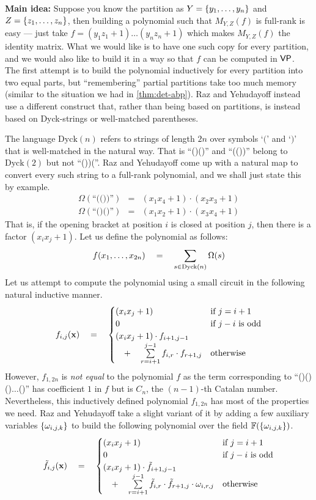 {\bf Main idea:} Suppose you know the partition as $Y = \left\{y_1,\dots, y_n\right\}$ and $Z = \left\{z_1,\dots, z_n\right\}$, then building a polynomial such that $M_{Y,Z}(f)$ is full-rank is easy --- just take $f = (y_1z_1 + 1)\dots (y_n z_n + 1)$ which makes $M_{Y,Z}(f)$ the identity matrix. 
What we would like is to have one such copy for every partition, and we would also like to build it in a way so that $f$ can be computed in $\mathsf{VP}$. \\

The first attempt is to build the polynomial inductively for every partition into two equal parts, but ``remembering'' partial partitions take too much memory (similar to the situation we had in \autoref{thm:det-abp}). 
Raz and Yehudayoff instead use a different construct that, rather than being based on partitions, is instead based on Dyck-strings or well-matched parentheses. 

The language $\mathrm{Dyck}(n)$ refers to strings of length $2n$ over symbols `$($' and `$)$' that is well-matched in the natural way. 
That is ``()()'' and ``(())'' belong to $\mathrm{Dyck}(2)$ but not ``())(''. 
Raz and Yehudayoff come up with a natural map to convert every such string to a full-rank polynomial, and we shall just state this by example. 
\begin{eqnarray*}
\Omega(\text{``(())''}) & = & (x_1x_4 + 1)\cdot (x_2x_3 + 1)\\
\Omega(\text{``()()''}) & = & (x_1x_2 + 1)\cdot (x_3x_4 + 1)
\end{eqnarray*}
That is, if the opening bracket at position $i$ is closed at position $j$, then there is a factor $(x_ix_j + 1)$. 
Let us define the polynomial as follows:
\[
f(x_1,\dots, x_{2n}) \quad = \quad \sum_{s\in \mathrm{Dyck}(n)} \Omega(s) 
\]
Let us attempt to compute the polynomial using a small circuit in the following natural inductive manner. 
\[
f_{i,j}(\mathbf{x}) \quad = \quad \begin{cases}
(x_ix_j+1) & \text{if $j = i+1$}\\
0 & \text{if $j-i$ is odd}\\
(x_ix_j+1) \cdot f_{i+1,j-1} &\\
 \quad + \quad \sum\limits_{r=i+1}^{j-1} f_{i,r}\cdot f_{r+1,j} & \text{otherwise}
\end{cases}
\]
However, $f_{1,2n}$ is \emph{not equal} to the polynomial $f$ as the term corresponding to ``()()()$\dots$()'' has coefficient $1$ in $f$ but is $C_n$, the $(n-1)$-th Catalan number. 
Nevertheless, this inductively defined polynomial $f_{1,2n}$ has most of the properties we need. 
Raz and Yehudayoff take a slight variant of it by adding a few auxiliary variables $\left\{\omega_{i,j,k}\right\}$ to build the following polynomial over the field $\mathbb{F}(\left\{\omega_{i,j,k}\right\})$. 
\[
\tilde{f}_{i,j}(\mathbf{x}) \quad = \quad \begin{cases}
(x_ix_j+1) & \text{if $j = i+1$}\\
0 & \text{if $j-i$ is odd}\\
(x_ix_j+1) \cdot \tilde{f}_{i+1,j-1} &\\
 \quad + \quad \sum\limits_{r=i+1}^{j-1} \tilde{f}_{i,r}\cdot \tilde{f}_{r+1,j} \cdot \omega_{i,r,j} & \text{otherwise}
\end{cases}
\]


